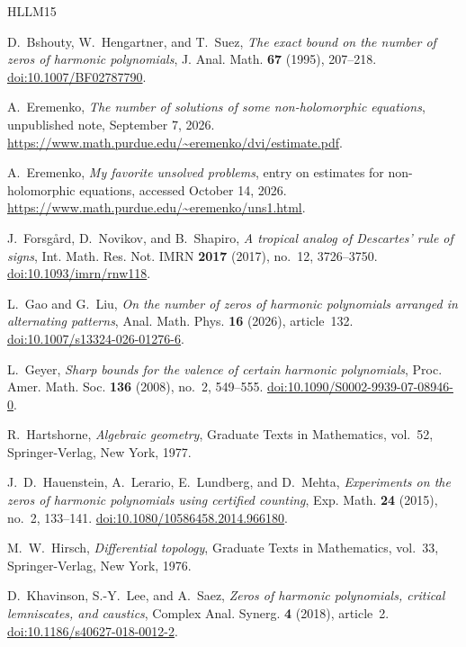 \documentclass[a4paper]{amsart}
\theoremstyle{remark}
\begin{document}
\clearpage
\begin{thebibliography}{HLLM15}

D.~Bshouty, W.~Hengartner, and T.~Suez,
\emph{The exact bound on the number of zeros of harmonic polynomials},
J. Anal. Math. \textbf{67} (1995), 207--218.
\href{https://doi.org/10.1007/BF02787790}{doi:10.1007/BF02787790}.

A.~Eremenko, \emph{The number of solutions of some non-holomorphic equations},
unpublished note, September 7, 2026.
\url{https://www.math.purdue.edu/~eremenko/dvi/estimate.pdf}.

A.~Eremenko, \emph{My favorite unsolved problems},
entry on estimates for non-holomorphic equations,
accessed October 14, 2026.
\url{https://www.math.purdue.edu/~eremenko/uns1.html}.

J.~Forsg{\aa}rd, D.~Novikov, and B.~Shapiro,
\emph{A tropical analog of Descartes' rule of signs},
Int. Math. Res. Not. IMRN \textbf{2017} (2017), no.~12, 3726--3750.
\href{https://doi.org/10.1093/imrn/rnw118}{doi:10.1093/imrn/rnw118}.

L.~Gao and G.~Liu,
\emph{On the number of zeros of harmonic polynomials arranged in alternating patterns},
Anal. Math. Phys. \textbf{16} (2026), article~132.
\href{https://doi.org/10.1007/s13324-026-01276-6}{doi:10.1007/s13324-026-01276-6}.

L.~Geyer, \emph{Sharp bounds for the valence of certain harmonic polynomials},
Proc. Amer. Math. Soc. \textbf{136} (2008), no.~2, 549--555.
\href{https://doi.org/10.1090/S0002-9939-07-08946-0}{doi:10.1090/S0002-9939-07-08946-0}.

R.~Hartshorne, \emph{Algebraic geometry},
Graduate Texts in Mathematics, vol.~52, Springer-Verlag, New York, 1977.

J.~D.~Hauenstein, A.~Lerario, E.~Lundberg, and D.~Mehta,
\emph{Experiments on the zeros of harmonic polynomials using certified counting},
Exp. Math. \textbf{24} (2015), no.~2, 133--141.
\href{https://doi.org/10.1080/10586458.2014.966180}{doi:10.1080/10586458.2014.966180}.

M.~W.~Hirsch, \emph{Differential topology},
Graduate Texts in Mathematics, vol.~33, Springer-Verlag, New York, 1976.

D.~Khavinson, S.-Y.~Lee, and A.~Saez,
\emph{Zeros of harmonic polynomials, critical lemniscates, and caustics},
Complex Anal. Synerg. \textbf{4} (2018), article~2.
\href{https://doi.org/10.1186/s40627-018-0012-2}{doi:10.1186/s40627-018-0012-2}.


\end{thebibliography}
\end{document}
